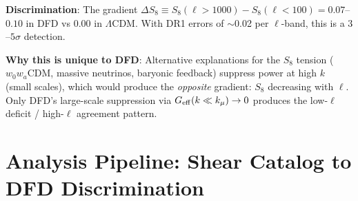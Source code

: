 \documentclass[11pt,a4paper]{article}
\newcommand{\LCDM}{$\Lambda$CDM}
\newcommand{\kmu}{k_\mu}
\newcommand{\Geff}{G_{\rm eff}}
\begin{document}
\textbf{Discrimination}: The gradient $\Delta S_8 \equiv
S_8(\ell > 1000) - S_8(\ell < 100) = 0.07$--$0.10$ in DFD vs $0.00$
in \LCDM. With DR1 errors of $\sim$0.02 per $\ell$-band, this is a
$3$--$5\sigma$ detection.

\textbf{Why this is unique to DFD}: Alternative explanations for the
$S_8$ tension ($w_0 w_a$CDM, massive neutrinos, baryonic feedback)
suppress power at high $k$ (small scales), which would produce the
\emph{opposite} gradient: $S_8$ decreasing with $\ell$. Only DFD's
large-scale suppression via $\Geff(k \ll \kmu) \to 0$ produces the
low-$\ell$ deficit / high-$\ell$ agreement pattern.


\section{Analysis Pipeline: Shear Catalog to DFD Discrimination}
\label{sec:pipeline}
\end{document}
